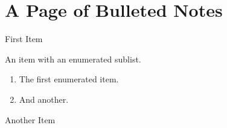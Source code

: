 \documentclass{revision}
\begin{document}

\section*{A Page of Bulleted Notes} 
\start

\item First Item

\item An item with an enumerated sublist.

	\begin{enumerate}
		\item The first enumerated item.
		\item And another.
	\end{enumerate}

\item Another Item

\finish
\end{document}
